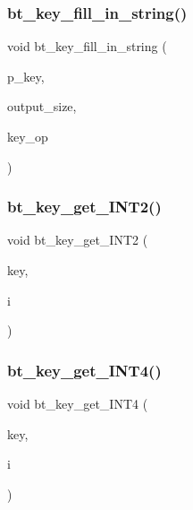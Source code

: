 \subsubsection{\texorpdfstring{bt\+\_\+key\+\_\+fill\+\_\+in\+\_\+string()}{bt\_key\_fill\_in\_string()}}
{\footnotesize\ttfamily void bt\+\_\+key\+\_\+fill\+\_\+in\+\_\+string (\begin{DoxyParamCaption}\item[{\mbox{\hyperlink{galois_8h_ab6cc7b4aeb6ea31aba2b3fbfc83ff5e6}{B\+Y\+TE}} $\ast$$\ast$}]{p\+\_\+key,  }\item[{\mbox{\hyperlink{galois_8h_a09fddde158a3a20bd2dcadb609de11dc}{I\+NT}}}]{output\+\_\+size,  }\item[{\mbox{\hyperlink{classdiscreta__base}{discreta\+\_\+base}} \&}]{key\+\_\+op }\end{DoxyParamCaption})}

\mbox{\label{bt__key_8_c_a6a73c042fa4b7f530a244c4fc6c9e8f2}} 
\subsubsection{\texorpdfstring{bt\+\_\+key\+\_\+get\+\_\+\+I\+N\+T2()}{bt\_key\_get\_INT2()}}
{\footnotesize\ttfamily void bt\+\_\+key\+\_\+get\+\_\+\+I\+N\+T2 (\begin{DoxyParamCaption}\item[{\mbox{\hyperlink{galois_8h_ab6cc7b4aeb6ea31aba2b3fbfc83ff5e6}{B\+Y\+TE}} $\ast$$\ast$}]{key,  }\item[{\mbox{\hyperlink{galois_8h_a919f8925f93a647c4e4b74773f35445b}{I\+N\+T2}} \&}]{i }\end{DoxyParamCaption})}

\mbox{\label{bt__key_8_c_ae2728a8a265629876b486504625977fa}} 
\subsubsection{\texorpdfstring{bt\+\_\+key\+\_\+get\+\_\+\+I\+N\+T4()}{bt\_key\_get\_INT4()}}
{\footnotesize\ttfamily void bt\+\_\+key\+\_\+get\+\_\+\+I\+N\+T4 (\begin{DoxyParamCaption}\item[{\mbox{\hyperlink{galois_8h_ab6cc7b4aeb6ea31aba2b3fbfc83ff5e6}{B\+Y\+TE}} $\ast$$\ast$}]{key,  }\item[{\mbox{\hyperlink{galois_8h_a6675ac57b948be915e03c09228b57b05}{I\+N\+T4}} \&}]{i }\end{DoxyParamCaption})}

